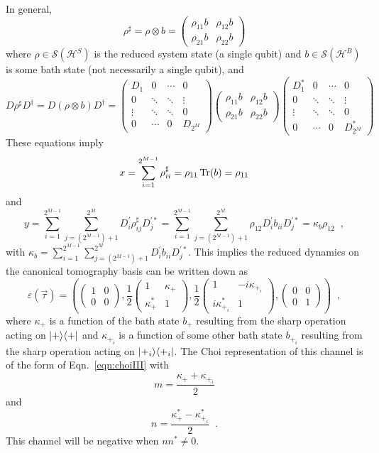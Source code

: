 In general,
\begin{equation}
\label{eqn:formref}
\rho^\sharp = \rho\otimes b = \begin{pmatrix} \rho_{11} b& \rho_{12} b\\ \rho_{21} b&\rho_{22} b\end{pmatrix}
\end{equation}
where $\rho\in\mathcal{S}(\mathcal{H}^S)$ is the reduced system state (a single qubit) and $b\in\mathcal{S}(\mathcal{H}^B)$ is some bath state (not necessarily a single qubit), and
$$
D\rho^\sharp D^\dagger = D\left(\rho\otimes b\right)D^\dagger = \begin{pmatrix} D_1 & 0 & \cdots & 0\\ 0 & \ddots & \ddots & \vdots \\ \vdots & \ddots & \ddots & 0 \\ 0 & \cdots & 0 & D_{2^M}\end{pmatrix} \begin{pmatrix} \rho_{11} b& \rho_{12} b\\ \rho_{21} b&\rho_{22} b\end{pmatrix}  \begin{pmatrix} D_1^* & 0 & \cdots & 0\\ 0 & \ddots & \ddots & \vdots \\ \vdots & \ddots & \ddots & 0 \\ 0 & \cdots & 0 & D_{2^M}^*\end{pmatrix}
$$
These equations imply
$$
x= \sum_{i=1}^{2^{M-1}} \rho^\sharp_{ii} = \rho_{11} \operatorname{Tr}(b) = \rho_{11}
$$
and
$$
y = \sum_{i=1}^{2^{M-1}} \sum_{j=(2^{M-1})+1}^{2^M} D^\prime_{i} \rho^\sharp_{ij} D^{\prime *}_j = \sum_{i=1}^{2^{M-1}} \sum_{j=(2^{M-1})+1}^{2^M} \rho_{12} D^\prime_{i} b_{ii} D^{\prime *}_j = \kappa_b \rho_{12}\;\;,
$$
with $\kappa_b = \sum_{i=1}^{2^{M-1}} \sum_{j=(2^{M-1})+1}^{2^M} D^\prime_{i} b_{ii} D^{\prime *}_j$.  This implies the reduced dynamics on the canonical tomography basis can be written down as
$$
\varepsilon(\vec{\tau}) = \left(\begin{pmatrix}
1&0\\0&0
\end{pmatrix},\frac{1}{2}\begin{pmatrix}
1&\kappa_+\\\kappa_+^*&1
\end{pmatrix},\frac{1}{2}\begin{pmatrix}
1&-i\kappa_{+_i}\\i\kappa_{+_i}^*&1
\end{pmatrix},\begin{pmatrix}
0&0\\0&1
\end{pmatrix}\right)\;\;,
$$
where $\kappa_+$ is a function of the bath state $b_+$ resulting from the sharp operation acting on $|+\rangle\langle+|$ and $\kappa_{+_i}$ is a function of some other bath state $b_{+_i}$ resulting from the sharp operation acting on $|+_i\rangle\langle+_i|$.  The Choi representation of this channel is of the form of Eqn.\ \ref{eqn:choiIII} with
$$
m = \frac{\kappa_++\kappa_{+_i}}{2}
$$
and
$$
n = \frac{\kappa_+^*-\kappa_{+_i}^*}{2}\;\;.
$$
This channel will be negative when $nn^*\neq 0$.  

